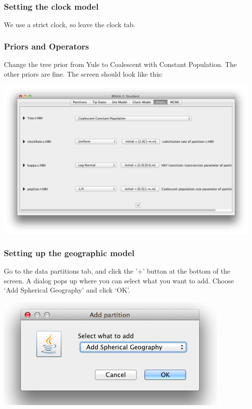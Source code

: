 \documentclass{article}
\begin{document}
\subsubsection*{Setting the clock model}

We use a strict clock, so leave the clock tab.

\subsubsection*{Priors and Operators}

Change the tree prior from Yule to Coalescent with Constant Population. The other priors are fine. The screen should look like this:

\includegraphics[scale=0.4,clip=true,trim=0 400 0 0]{figures/BEAUti_priors.png}


\subsubsection*{Setting up the geographic model}

Go to the data partitions tab, and click the '+' button at the bottom of the screen.
A dialog pops up where you can select what you want to add. Choose `Add Spherical Geography'
and click `OK'.

\includegraphics[scale=0.4]{figures/BEAUti_geography1.png}
\end{document}
